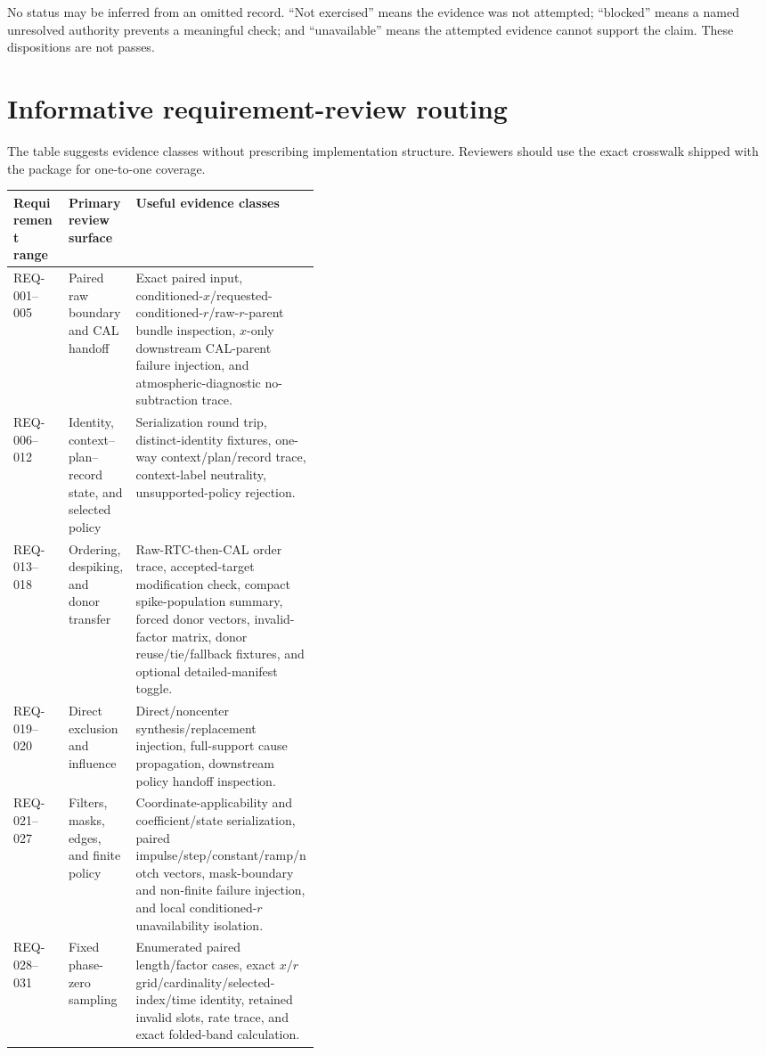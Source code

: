 \documentclass[10pt]{article}
\begin{document}
No status may be inferred from an omitted record.  ``Not exercised'' means
the evidence was not attempted; ``blocked'' means a named unresolved authority
prevents a meaningful check; and ``unavailable'' means the attempted evidence
cannot support the claim.  These dispositions are not passes.

\section{Informative requirement-review routing}
\label{sec:eng-routing}

The table suggests evidence classes without prescribing implementation
structure.  Reviewers should use the exact crosswalk shipped with the package
for one-to-one coverage.

\footnotesize
\begin{tabularx}{\linewidth}{@{}p{0.18\linewidth}p{0.22\linewidth}X@{}}
\toprule
Requirement range & Primary review surface & Useful evidence classes \\
\midrule
REQ-001--005 & Paired raw boundary and CAL handoff & Exact paired input, conditioned-$x$/requested-conditioned-$r$/raw-$r$-parent bundle inspection, $x$-only downstream CAL-parent failure injection, and atmospheric-diagnostic no-subtraction trace. \\
REQ-006--012 & Identity, context--plan--record state, and selected policy & Serialization round trip, distinct-identity fixtures, one-way context/plan/record trace, context-label neutrality, unsupported-policy rejection. \\
REQ-013--018 & Ordering, despiking, and donor transfer & Raw-RTC-then-CAL order trace, accepted-target modification check, compact spike-population summary, forced donor vectors, invalid-factor matrix, donor reuse/tie/fallback fixtures, and optional detailed-manifest toggle. \\
REQ-019--020 & Direct exclusion and influence & Direct/noncenter synthesis/replacement injection, full-support cause propagation, downstream policy handoff inspection. \\
REQ-021--027 & Filters, masks, edges, and finite policy & Coordinate-applicability and coefficient/state serialization, paired impulse/step/constant/ramp/notch vectors, mask-boundary and non-finite failure injection, and local conditioned-$r$ unavailability isolation. \\
REQ-028--031 & Fixed phase-zero sampling & Enumerated paired length/factor cases, exact $x/r$ grid/cardinality/selected-index/time identity, retained invalid slots, rate trace, and exact folded-band calculation. \\

\end{tabularx}
\end{document}
